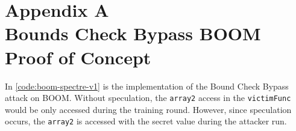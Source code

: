 \vspace{10em}
\section*{Appendix A\\
          Bounds Check Bypass BOOM Proof of Concept}

In \ref{code:boom-spectre-v1} is the implementation of the Bound Check Bypass attack
on BOOM. Without speculation, the {\tt array2} access in the {\tt victimFunc} would be only accessed
during the training round. However, since speculation occurs, the {\tt array2} is accessed with
the secret value during the attacker run.

\onecolumn

\label{code:boom-spectre-v1}

